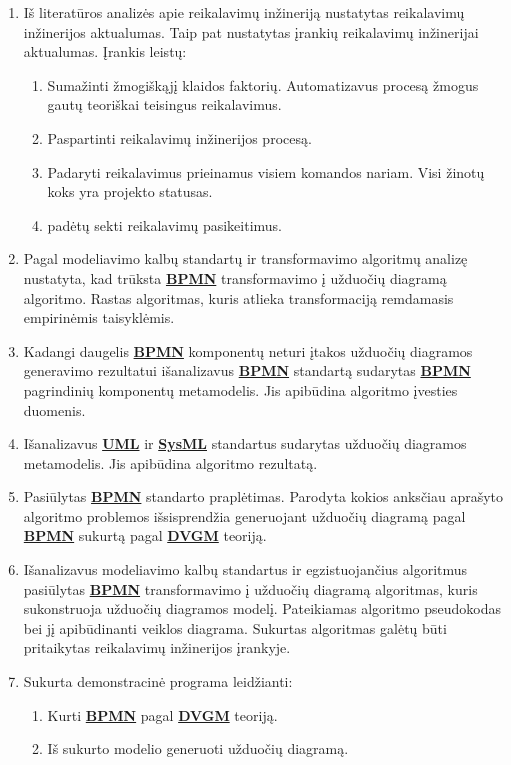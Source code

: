 \documentclass{VUMIFInfBakalaurinis}
\newcommand{\bhyperref}[2]{\hyperref[#1]{\textbf{#2}}}
\newcommand{\DVCM}{\bhyperref{section:dvcm}{DVGM}}
\newcommand{\BPMN}{\bhyperref{section:bpmn}{BPMN}}
\newcommand{\UML}{\bhyperref{def:uml}{UML}}
\newcommand{\SysML}{\bhyperref{def:sysml}{SysML}}
\begin{document}
\begin{enumerate}
  \item Iš literatūros analizės apie reikalavimų inžineriją nustatytas reikalavimų inžinerijos aktualumas. Taip pat nustatytas įrankių reikalavimų inžinerijai aktualumas. Įrankis leistų:
  \begin{enumerate}
    \item Sumažinti žmogiškąjį klaidos faktorių. Automatizavus procesą žmogus gautų teoriškai teisingus reikalavimus.
    \item Paspartinti reikalavimų inžinerijos procesą.
    \item Padaryti reikalavimus prieinamus visiem komandos nariam. Visi žinotų koks yra projekto statusas.
    \item padėtų sekti reikalavimų pasikeitimus.
  \end{enumerate}
  \item Pagal modeliavimo kalbų standartų ir transformavimo algoritmų analizę nustatyta, kad trūksta \BPMN{} transformavimo į užduočių diagramą algoritmo. Rastas algoritmas, kuris atlieka transformaciją remdamasis empirinėmis taisyklėmis.
  \item Kadangi daugelis \BPMN{} komponentų neturi įtakos užduočių diagramos generavimo rezultatui išanalizavus \BPMN{} standartą sudarytas \BPMN{} pagrindinių komponentų metamodelis. Jis apibūdina algoritmo įvesties duomenis.
  \item Išanalizavus \UML{} ir \SysML{} standartus sudarytas užduočių diagramos metamodelis. Jis apibūdina algoritmo rezultatą.
  \item Pasiūlytas \BPMN{} standarto praplėtimas. Parodyta kokios anksčiau aprašyto algoritmo problemos išsisprendžia generuojant užduočių diagramą pagal \BPMN{} sukurtą pagal \DVCM{} teoriją.
  \item Išanalizavus modeliavimo kalbų standartus ir egzistuojančius algoritmus pasiūlytas \BPMN{} transformavimo į užduočių diagramą algoritmas, kuris sukonstruoja užduočių diagramos modelį. Pateikiamas algoritmo pseudokodas bei jį apibūdinanti veiklos diagrama. Sukurtas algoritmas galėtų būti pritaikytas reikalavimų inžinerijos įrankyje.
  \item Sukurta demonstracinė programa leidžianti:
  \begin{enumerate}
    \item Kurti \BPMN{} pagal \DVCM{} teoriją.
    \item Iš sukurto modelio generuoti užduočių diagramą.
  \end{enumerate}
\end{enumerate}
\end{document}
